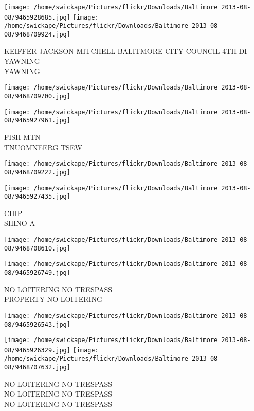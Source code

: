 \documentclass[10pt,letterpaper]{article}
\begin{document}
\vspace{0.25in}
\texttt{[image: /home/swickape/Pictures/flickr/Downloads/Baltimore 2013-08-08/9465928685.jpg]}
\texttt{[image: /home/swickape/Pictures/flickr/Downloads/Baltimore 2013-08-08/9468709924.jpg]}

KEIFFER JACKSON MITCHELL BALITMORE CITY COUNCIL 4TH DI\\
YAWNING\\
YAWNING
\pagebreak

\texttt{[image: /home/swickape/Pictures/flickr/Downloads/Baltimore 2013-08-08/9468709700.jpg]}

\vspace{0.25in}
\texttt{[image: /home/swickape/Pictures/flickr/Downloads/Baltimore 2013-08-08/9465927961.jpg]}

FISH MTN\\
TNUOMNEERG TSEW
\pagebreak

\texttt{[image: /home/swickape/Pictures/flickr/Downloads/Baltimore 2013-08-08/9468709222.jpg]}

\vspace{0.25in}
\texttt{[image: /home/swickape/Pictures/flickr/Downloads/Baltimore 2013-08-08/9465927435.jpg]}

CHIP\\
SHINO A+
\pagebreak

\texttt{[image: /home/swickape/Pictures/flickr/Downloads/Baltimore 2013-08-08/9468708610.jpg]}

\vspace{0.25in}
\texttt{[image: /home/swickape/Pictures/flickr/Downloads/Baltimore 2013-08-08/9465926749.jpg]}

NO LOITERING NO TRESPASS\\
PROPERTY NO LOITERING
\pagebreak

\texttt{[image: /home/swickape/Pictures/flickr/Downloads/Baltimore 2013-08-08/9465926543.jpg]}

\vspace{0.25in}
\texttt{[image: /home/swickape/Pictures/flickr/Downloads/Baltimore 2013-08-08/9465926329.jpg]}
\texttt{[image: /home/swickape/Pictures/flickr/Downloads/Baltimore 2013-08-08/9468707632.jpg]}

NO LOITERING NO TRESPASS\\
NO LOITERING NO TRESPASS\\
NO LOITERING NO TRESPASS
\pagebreak
\end{document}
